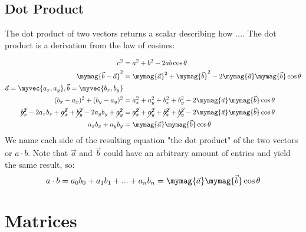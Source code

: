 		\subsection{Dot Product}
			The dot product of two vectors returns a scalar describing how ....
			The dot product is a derivation from the law of cosines: \\
			\begin{align*}
				c^2 &= a^2 + b^2 -2ab\cos\theta \\
				\mymag{\vec b - \vec a}^2 &= \mymag{\vec a}^2 + \mymag{\vec b}^2 - 2\mymag{\vec a}\mymag{\vec b}\cos\theta\\
				\vec a = \myvec{a_x,a_y}, \vec b = \myvec{b_x,b_y}\\
				(b_x-a_x)^2 + (b_y-a_y)^2 &= a_x^2 + a_y^2 + b_x^2 + b_y^2 - 2\mymag{\vec a}\mymag{\vec b}\cos\theta\\
				\cancel{b_x^2}-2a_xb_x+\cancel{a_x^2}+\cancel{b_y^2}-2a_yb_y+\cancel{a_y^2}	&= \cancel{a_x^2} + \cancel{a_y^2} + \cancel{b_x^2} + \cancel{b_y^2} - 2\mymag{\vec a}\mymag{\vec b}\cos\theta\\
				a_xb_x+a_yb_y &= \mymag{\vec a}\mymag{\vec b}\cos\theta
			\end{align*}
			We name each side of the resulting equation "the dot product" of the two vectors or $a\cdot b$. Note that $\vec a$ and $\vec b$ could have an arbitrary amount of entries and yield the same result, so:
			\begin{equation}
				a\cdot b = a_0b_0+a_1b_1+...+a_nb_n = \mymag{\vec a}\mymag{\vec b}\cos\theta
			\end{equation}
	\section{Matrices}

